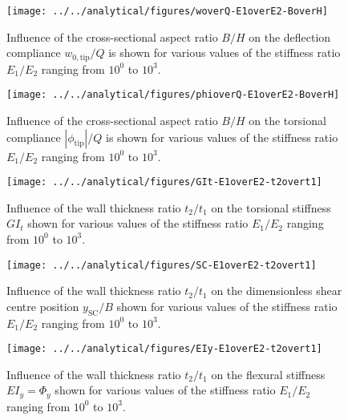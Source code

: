 \begin{figure}[!htpb] %
  \centering
  \texttt{[image: ../../analytical/figures/woverQ-E1overE2-BoverH]}
  \caption[Influence of the cross-sectional aspect ratio $B/H$ on the deflection compliance]{Influence of the cross-sectional aspect ratio $B/H$ on the deflection compliance $w_{\mathrm{0,tip}} / Q$ is shown for various values of the stiffness ratio $E_1/E_2$ ranging from $10^0$ to $10^3$. }\label{fig:woverQ-E1overE2-BoverH}
\end{figure}

\begin{figure}[!htpb] %
  \centering
  \texttt{[image: ../../analytical/figures/phioverQ-E1overE2-BoverH]}
  \caption[Influence of the cross-sectional aspect ratio $B/H$ on the torsional compliance]{Influence of the cross-sectional aspect ratio $B/H$ on the torsional compliance $|\phi_{\mathrm{tip}}| / Q$ is shown for various values of the stiffness ratio $E_1/E_2$ ranging from $10^0$ to $10^3$. }\label{fig:phioverQ-E1overE2-BoverH}
\end{figure}

\begin{figure}[!htpb] %
  \centering
  \texttt{[image: ../../analytical/figures/GIt-E1overE2-t2overt1]}
  \caption[Influence of the wall thickness ratio $t_2/t_1$ on the torsional stiffness $GI_t$]{Influence of the wall thickness ratio $t_2/t_1$ on the torsional stiffness $GI_t$ shown for various values of the stiffness ratio $E_1/E_2$ ranging from $10^0$ to $10^3$. }\label{fig:GIt-E1overE2-t2overt1}
\end{figure}

\begin{figure}[!htpb] %
  \centering
  \texttt{[image: ../../analytical/figures/SC-E1overE2-t2overt1]}
  \caption[Influence of the wall thickness ratio $t_2/t_1$ on the dimensionless shear centre position $y_{\mathrm{SC}}/B$]{Influence of the wall thickness ratio $t_2/t_1$ on the dimensionless shear centre position $y_{\mathrm{SC}}/B$ shown for various values of the stiffness ratio $E_1/E_2$ ranging from $10^0$ to $10^3$. }\label{fig:SC-E1overE2-t2overt1}
\end{figure}

\begin{figure}[!htpb] %
  \centering
  \texttt{[image: ../../analytical/figures/EIy-E1overE2-t2overt1]}
  \caption[Influence of the wall thickness ratio $t_2/t_1$ on the flexural stiffness $EI_y$]{Influence of the wall thickness ratio $t_2/t_1$ on the flexural stiffness $EI_y = \Phi_y$ shown for various values of the stiffness ratio $E_1/E_2$ ranging from $10^0$ to $10^3$. }\label{fig:EIy-E1overE2-t2overt1}
\end{figure}

